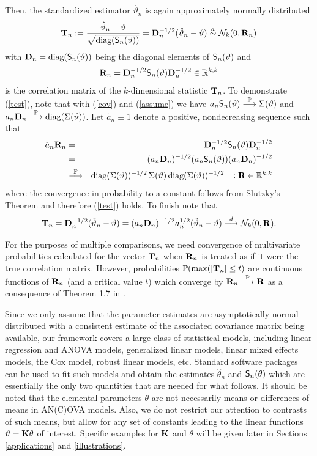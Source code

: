 \documentclass[12pt,a4paper]{article}
\begin{document}
Then, the standardized estimator $\hat{\vartheta}_n$ is again approximately normally
distributed
\begin{eqnarray} \label{test}
\T_n := \frac{\hat{\vartheta}_n - \vartheta}{\sqrt{\diag(\S_n(\vartheta))}} = \D_n^{-1/2}
(\hat{\vartheta}_n - \vartheta) \an \N_k(0, \Cor_n)
\end{eqnarray}
with $\D_n = \diag(\S_n(\vartheta))$ being the diagonal elements of
$\S_n(\vartheta)$ and 
\begin{eqnarray*}
\Cor_n = \D_n^{-1/2} \S_n(\vartheta) \D_n^{-1/2} \in \R^{k,k} 
\end{eqnarray*}
is the correlation matrix of the $k$-dimensional statistic 
$\T_n$. To demonstrate (\ref{test}), note that 
with (\ref{cov}) and (\ref{assume}) we have $a_n \S_n(\vartheta) \cP \Sigma(\vartheta)$ 
and $a_n \D_n \cP \diag(\Sigma(\vartheta))$. Let $\tilde{a}_n
\equiv 1$  denote a positive, nondecreasing sequence such that
\begin{eqnarray*}
\tilde{a}_n \Cor_n  & = & \D_n^{-1/2} \S_n(\vartheta) \D_n^{-1/2} \\
& = & (a_n \D_n)^{-1/2} (a_n \S_n(\vartheta)) (a_n \D_n)^{-1/2} \\
& \cP & \diag(\Sigma(\vartheta))^{-1/2} \, \Sigma(\vartheta) \, \diag(\Sigma(\vartheta))^{-1/2} 
=: \Cor \in \R^{k,k}
\end{eqnarray*}
where the convergence in probability to a constant follows from
Slutzky's Theorem \citep[Theorem 1.5.4,][]{Serfling1980} and 
therefore (\ref{test}) holds. To finish note that
\begin{eqnarray*}
\T_n = \D_n^{-1/2} (\hat{\vartheta}_n - \vartheta) = (a_n \D_n)^{-1/2}
a_n^{1/2} (\hat{\vartheta}_n - \vartheta) \cL \N_k(0, \Cor).
\end{eqnarray*}

For the purposes of multiple comparisons, we need convergence of
multivariate probabilities calculated for the vector $\T_{n}$ when $\Cor_n$ 
is treated as if it were the true correlation matrix. 
However, probabilities $\Prob(\max(|\T_n| \le t)$
are continuous functions of $\Cor_n$ (and a critical value $t$) which converge by
$\Cor_n \cP \Cor$ as a consequence of Theorem 1.7 in \cite{Serfling1980}.

Since we only assume that the parameter estimates are
asymptotically normal distributed with a consistent estimate of the
associated covariance matrix being available, our framework covers a large
class of statistical models, including linear regression and ANOVA models,
generalized linear models, linear mixed effects models, the Cox model,
robust linear models, etc. Standard software packages can be used to fit
such models and obtain the estimates $\hat{\theta}_n$ and $\S_n(\theta)$
which are essentially the only two quantities that are needed for what
follows. It should be noted that the elemental parameters $\theta$ are not
necessarily means or differences of means in AN(C)OVA models. Also, we do
not restrict our attention to contrasts of such means, but allow for any set
of constants leading to the linear functions $\vartheta = \K\theta $ of interest.
Specific examples for $\K$ and $\theta $ will be given later in Sections~%
\ref{applications} and \ref{illustrations}.
\end{document}
